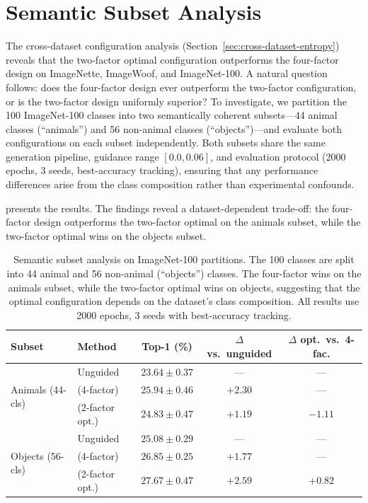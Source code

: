 \section{Semantic Subset Analysis}
\label{sec:semantic-subset}

The cross-dataset configuration analysis (Section~\ref{sec:cross-dataset-entropy}) reveals that the two-factor optimal configuration outperforms the four-factor design on ImageNette, ImageWoof, and ImageNet-100. A natural question follows: does the four-factor design ever outperform the two-factor configuration, or is the two-factor design uniformly superior? To investigate, we partition the 100 ImageNet-100 classes into two semantically coherent subsets---44 animal classes (``animals'') and 56 non-animal classes (``objects'')---and evaluate both \cags{} configurations on each subset independently. Both subsets share the same generation pipeline, guidance range $[0.0, 0.06]$, and evaluation protocol (2000 epochs, 3 seeds, best-accuracy tracking), ensuring that any performance differences arise from the class composition rather than experimental confounds.

 presents the results. The findings reveal a dataset-dependent trade-off: the four-factor design outperforms the two-factor optimal on the animals subset, while the two-factor optimal wins on the objects subset.

\begin{table}[t]
\centering
\caption{Semantic subset analysis on ImageNet-100 partitions. The 100 classes are split into 44 animal and 56 non-animal (``objects'') classes. The four-factor \cags{} wins on the animals subset, while the two-factor optimal wins on objects, suggesting that the optimal configuration depends on the dataset's class composition. All results use 2000 epochs, 3 seeds with best-accuracy tracking.}
\label{tab:semantic-subset}
\begin{tabular}{llccc}
\toprule
\textbf{Subset} & \textbf{Method} & \textbf{Top-1 (\%)} & \textbf{$\Delta$ vs.\ unguided} & \textbf{$\Delta$ opt.\ vs.\ 4-fac.} \\
\midrule
\multirow{3}{*}{Animals (44-cls)} & Unguided & $23.64 \pm 0.37$ & --- & --- \\
 & \cags{} (4-factor) & $\mathbf{25.94 \pm 0.46}$ & $\mathbf{+2.30}$ & --- \\
 & \cags{} (2-factor opt.) & $24.83 \pm 0.47$ & $+1.19$ & $-1.11$ \\
\midrule
\multirow{3}{*}{Objects (56-cls)} & Unguided & $25.08 \pm 0.29$ & --- & --- \\
 & \cags{} (4-factor) & $26.85 \pm 0.25$ & $+1.77$ & --- \\
 & \cags{} (2-factor opt.) & $\mathbf{27.67 \pm 0.47}$ & $\mathbf{+2.59}$ & $+0.82$ \\
\bottomrule
\end{tabular}
\end{table}

